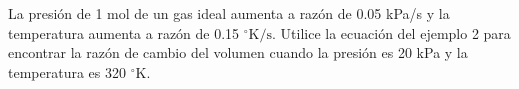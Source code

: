 \item La presión de 1 mol de un gas ideal aumenta a razón de 0.05 kPa/s y la temperatura aumenta a razón de 0.15 $^\circ\text{K/s}$. Utilice la ecuación del ejemplo 2 para encontrar la razón de cambio del volumen cuando la presión es 20 kPa y la temperatura es 320 $^\circ\text{K}$.
